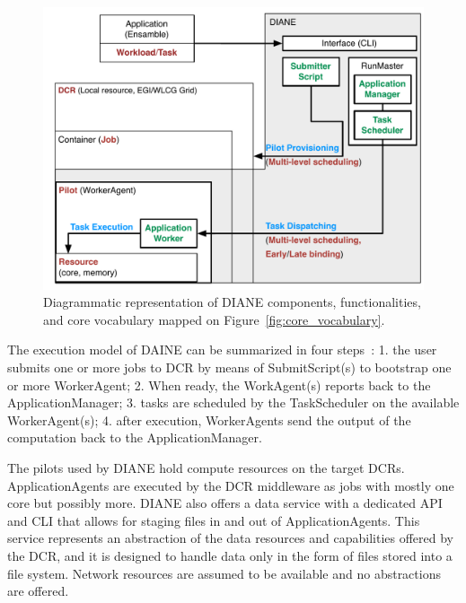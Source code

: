 \documentclass{sig-alternate}
\begin{document}
\begin{figure}[t]
    \centering
        \includegraphics[width=.48\textwidth]{figures/diane_comparison.pdf}
    \caption{Diagrammatic representation of DIANE components, functionalities,
    and core vocabulary mapped on Figure~\ref{fig:core_vocabulary}.}
    \label{fig:diane_comparison}
\end{figure}

The execution model of DAINE can be summarized in four
steps~\cite{moscicki2011understanding}: 1. the user submits one or more jobs to
DCR by means of SubmitScript(s) to bootstrap one or more WorkerAgent; 2. When
ready, the WorkAgent(s) reports back to the ApplicationManager; 3. tasks are
scheduled by the TaskScheduler on the available WorkerAgent(s); 4. after
execution, WorkerAgents send the output of the computation back to the
ApplicationManager.

 


The pilots used by DIANE hold compute resources on the target DCRs.
ApplicationAgents are executed by the DCR middleware as jobs with mostly one
core but possibly more. DIANE also offers a data service with a dedicated API
and CLI that allows for staging files in and out of ApplicationAgents. This
service represents an abstraction of the data resources and capabilities offered
by the DCR, and it is designed to handle data only in the form of files stored
into a file system. Network resources are assumed to be available and no
abstractions are offered.

\end{document}
